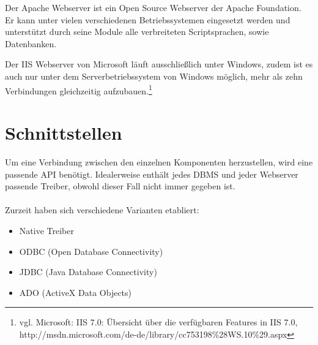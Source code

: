 Der Apache Webserver ist ein Open Source Webserver der Apache Foundation.
Er kann unter vielen verschiedenen Betriebssystemen eingesetzt werden und unterstützt durch seine Module alle verbreiteten Scriptsprachen, sowie Datenbanken.

Der IIS Webserver von Microsoft läuft ausschließlich unter Windows, zudem ist es auch nur unter dem Serverbetriebssystem von Windows möglich, mehr als zehn Verbindungen gleichzeitig aufzubauen.\footnote{vgl. Microsoft: IIS 7.0: Übersicht über die verfügbaren Features in IIS 7.0, http://msdn.microsoft.com/de-de/library/cc753198\%28WS.10\%29.aspx}

\section{Schnittstellen}
\label{sec:schnittstellen}


Um eine Verbindung zwischen den einzelnen Komponenten herzustellen, wird eine passende API benötigt.
Idealerweise enthält jedes DBMS und jeder Webserver passende Treiber, obwohl dieser Fall nicht immer gegeben ist.\\\\
Zurzeit haben sich verschiedene Varianten etabliert:

\begin{itemize}
\item Native Treiber
\item ODBC (Open Database Connectivity)
\item JDBC (Java Database Connectivity)
\item ADO (ActiveX Data Objects)
\end{itemize}

